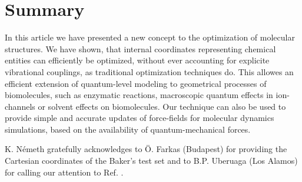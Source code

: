 \documentclass[prl,aps,twocolumn,showpacs,twocolumngrid,superbib]{revtex4}
\begin{document}
\section{Summary}
In this article we have presented a new concept
to the optimization of molecular structures.
We have shown, that internal coordinates representing chemical 
entities can efficiently be optimized, without
ever accounting for explicite vibrational couplings, as traditional
optimization techniques do. This allowes an efficient
extension of quantum-level modeling to geometrical processes
of biomolecules, such as enzymatic reactions, macroscopic quantum 
effects in ion-channels or solvent effects on biomolecules.
Our technique can also be used
to provide simple and accurate updates of force-fields
for molecular dynamics simulations, based on the availability of
quantum-mechanical forces.

\begin{acknowledgments}
K. N{\'e}meth gratefully acknowledges to 
{\"{O}}. Farkas (Budapest) for 
providing the Cartesian coordinates of the Baker's test set and to
B.P. Uberuaga (Los Alamos) for calling our attention to Ref. 
\cite{force-matching}.
\end{acknowledgments}


\end{document}
